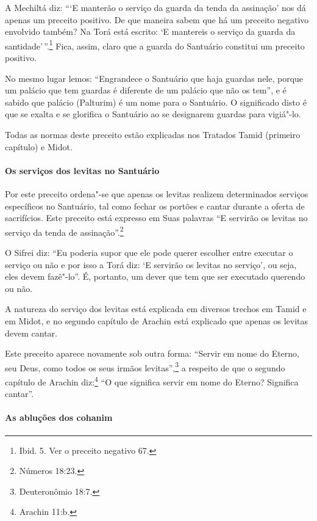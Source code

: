 \begin{multicols}{2}
A Mechiltá\starr{} diz: ```E manterão o serviço da guarda da tenda da assinação'
nos dá apenas um preceito positivo. De que maneira sabem que há um
preceito negativo envolvido também? Na Torá\starr{} está escrito: `E mantereis
o serviço da guarda da santidade'\,''.\footnote{Ibid. 5. Ver o preceito negativo 67.} Fica, assim, claro que a guarda do Santuário constitui um preceito positivo.

No mesmo lugar lemos: ``Engrandece o Santuário que haja guardas nele,
porque um palácio que tem guardas é diferente de um palácio que não os
tem'', e é sabido que palácio (Palturim) é um nome para o Santuário. O
significado disto é que se exalta e se glorifica o Santuário ao se
designarem guardas para vigiá"-lo.

Todas as normas deste preceito estão explicadas nos Tratados Tamid\starr{}
(primeiro capítulo) e Midot\starr.

\paragraph{Os serviços dos levitas\starr{} no Santuário}

Por este preceito ordena"-se que apenas os levitas\starr{} realizem determinados
serviços específicos no Santuário, tal como fechar os portões e cantar
durante a oferta de sacrifícios. Este preceito está expresso em Suas
palavras ``E servirão os levitas\starr{} no serviço da tenda de assinação''.\footnote{Números 18:23.}

O Sifrei\starr{} diz: ``Eu poderia supor que ele pode querer escolher entre
executar o serviço ou não e por isso a Torá\starr{} diz: `E servirão os levitas\starr{}
no serviço', ou seja, eles devem fazê"-lo''. É, portanto, um dever que
tem que ser executado querendo ou não.

A natureza do serviço dos levitas\starr{} está explicada em diversos trechos em
Tamid\starr{} e em Midot\starr, e no segundo capítulo de Arachin\starr{} está explicado que
apenas os levitas\starr{} devem cantar.

Este preceito aparece novamente sob outra forma: ``Servir em nome do
Eterno, seu Deus, como todos os seus irmãos levitas\starr{}'',\footnote{Deuteronômio
18:7.} a respeito de que o segundo capítulo de Arachin\starr{}
diz:\footnote{Arachin 11:b.} ``O que significa servir em nome do Eterno?
Significa cantar''.

\paragraph{As abluções dos cohanim\starr{}}


\end{multicols}
